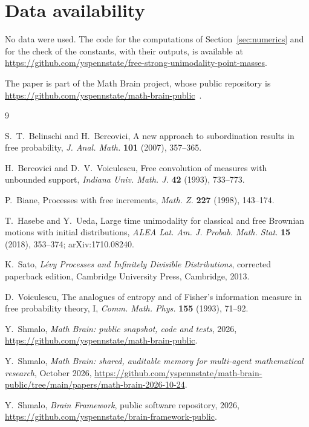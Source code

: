 \documentclass[11pt]{amsart}
\theoremstyle{definition}
\theoremstyle{remark}
\numberwithin{equation}{section}
\begin{document}
\section*{Data availability}
No data were used. The code for the computations of Section~\ref{sec:numerics} and for the check of the constants, with their outputs, is available at\\ \url{https://github.com/yspennstate/free-strong-unimodality-point-masses}.

The paper is part of the Math Brain project, whose public repository is \url{https://github.com/yspennstate/math-brain-public}~\cite{MathBrainRepo}.

\begin{thebibliography}{9}

S.~T.~Belinschi and H.~Bercovici, A new approach to subordination results in free probability, \emph{J. Anal. Math.} \textbf{101} (2007), 357--365.

H.~Bercovici and D.~V.~Voiculescu, Free convolution of measures with unbounded support, \emph{Indiana Univ. Math. J.} \textbf{42} (1993), 733--773.

P.~Biane, Processes with free increments, \emph{Math. Z.} \textbf{227} (1998), 143--174.

T.~Hasebe and Y.~Ueda, Large time unimodality for classical and free Brownian motions with initial distributions, \emph{ALEA Lat. Am. J. Probab. Math. Stat.} \textbf{15} (2018), 353--374; arXiv:1710.08240.

K.~Sato, \emph{L\'evy Processes and Infinitely Divisible Distributions}, corrected paperback edition, Cambridge University Press, Cambridge, 2013.

D.~Voiculescu, The analogues of entropy and of Fisher's information measure in free probability theory, I, \emph{Comm. Math. Phys.} \textbf{155} (1993), 71--92.

 Y.~Shmalo, \emph{Math Brain: public snapshot, code and tests}, 2026, \url{https://github.com/yspennstate/math-brain-public}.

 Y.~Shmalo, \emph{Math Brain: shared, auditable memory for multi-agent mathematical research}, October 2026, \url{https://github.com/yspennstate/math-brain-public/tree/main/papers/math-brain-2026-10-24}.

 Y.~Shmalo, \emph{Brain Framework}, public software repository, 2026, \url{https://github.com/yspennstate/brain-framework-public}.

\end{thebibliography}
\end{document}
